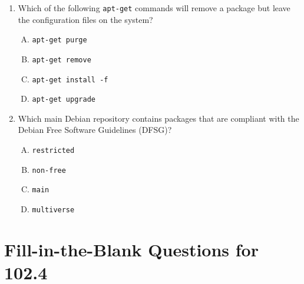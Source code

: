 \documentclass[a4paper]{report}
\begin{document}
\begin{enumerate}[1.]
    \item Which of the following \texttt{apt-get} commands will remove a package but leave the configuration files on the system?  
    \begin{enumerate}[A)]
        \item \texttt{apt-get purge}  
        \item \texttt{apt-get remove}  
        \item \texttt{apt-get install -f}  
        \item \texttt{apt-get upgrade}  
    \end{enumerate}

    \item Which main Debian repository contains packages that are compliant with the Debian Free Software Guidelines (DFSG)?  
    \begin{enumerate}[A)]
        \item \texttt{restricted}  
        \item \texttt{non-free}  
        \item \texttt{main}  
        \item \texttt{multiverse}  
    \end{enumerate}

\end{enumerate}




\newpage
\section*{Fill-in-the-Blank Questions for 102.4}
\end{document}

